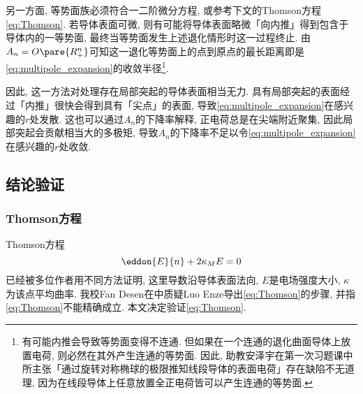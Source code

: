\documentclass[hidelinks]{ctexart}
\let\oldcite\cite
\def\cite#1{\textsuperscript{\oldcite{#1}}}
\begin{document}
\par
另一方面, 等势面族必须符合一二阶微分方程\cite{Smythe}, 或参考下文的Thomson方程\eqref{eq:Thomson}. 若导体表面可微, 则有可能将导体表面略微「向内推」得到包含于导体内的一等势面, 最终当等势面发生上述退化情形时这一过程终止. 由$A_n=O\pare{R_+^n}$可知这一退化等势面上的点到原点的最长距离即是\eqref{eq:multipole_expansion}的收敛半径\footnote{有可能内推会导致等势面变得不连通. 但如果在一个连通的退化曲面导体上放置电荷, 则必然在其外产生连通的等势面. 因此, 助教安泽宇在第一次习题课中所主张「通过旋转对称椭球的极限推知线段导体的表面电荷」存在缺陷不无道理, 因为在线段导体上任意放置全正电荷皆可以产生连通的等势面.}.
\par
因此, 这一方法对处理存在局部突起的导体表面相当无力. 具有局部突起的表面经过「内推」很快会得到具有「尖点」的表面, 导致\eqref{eq:multipole_expansion}在感兴趣的$r$处发散. 这也可以通过$A_n$的下降率解释, 正电荷总是在尖端附近聚集, 因此局部突起会贡献相当大的多极矩, 导致$A_n$的下降率不足以令\eqref{eq:multipole_expansion}在感兴趣的$r$处收敛.



\subsection*{结论验证} %
\label{sub:结论验证}

\subsubsection*{Thomson方程} %
\label{ssub:thomson方程}

Thomson方程
\begin{equation}
    \label{eq:Thomson}
    \eddon{E}{n} + 2\kappa_M E = 0
\end{equation}
已经被多位作者用不同方法证明\cite{Bhattacharya}, 这里导数沿导体表面法向, $E$是电场强度大小, $\kappa$为该点平均曲率. 我校Fan Desen在\cite{Fan_1988}中质疑Luo Enze\cite{Enze_1986}导出\eqref{eq:Thomson}的步骤, 并指\eqref{eq:Thomson}不能精确成立. 本文决定验证\eqref{eq:Thomson}.
\end{document}
